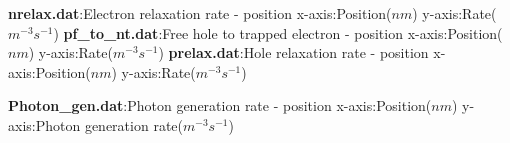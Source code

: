 \newline
\textbf{nrelax.dat}:Electron relaxation rate - position\newline
x-axis:Position($nm$)\newline
y-axis:Rate($m^{-3} s^{-1}$)\newline
\newline
\textbf{pf\_to\_nt.dat}:Free hole to trapped electron - position\newline
x-axis:Position($nm$)\newline
y-axis:Rate($m^{-3} s^{-1}$)\newline
\newline
\textbf{prelax.dat}:Hole relaxation rate - position\newline
x-axis:Position($nm$)\newline
y-axis:Rate($m^{-3} s^{-1}$)\newline
\newline

\textbf{Photon\_gen.dat}:Photon generation rate - position\newline
x-axis:Position($nm$)\newline
y-axis:Photon generation rate($m^{-3} s^{-1}$)\newline

